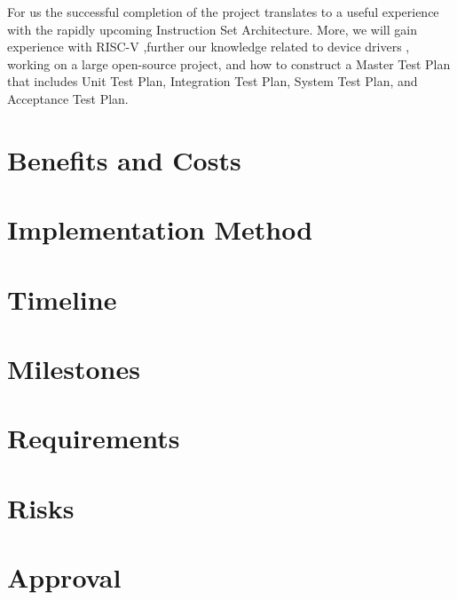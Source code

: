 For us the successful completion of the project translates to a useful experience with the rapidly upcoming Instruction Set Architecture. More, we will gain experience with RISC-V ,further our knowledge related to device drivers , working on a large open-source project, and how to construct a Master Test Plan that includes Unit Test Plan, Integration Test Plan, System Test Plan, and Acceptance Test Plan.

\section{Benefits and Costs}


\section{Implementation Method}

\section{Timeline}

\section{Milestones}

\section{Requirements}

\section{Risks}

\section{Approval}





